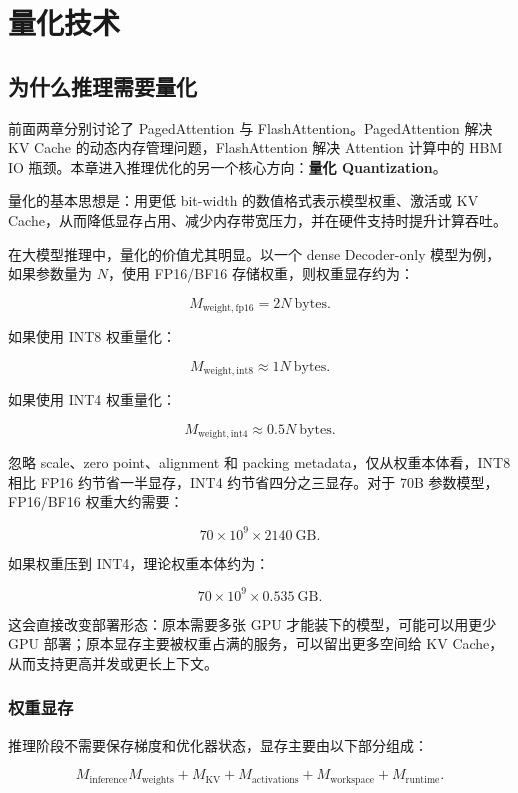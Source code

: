 \chapter{量化技术}
\label{chap:quantization}

\section{为什么推理需要量化}
\label{sec:why-inference-needs-quantization}

前面两章分别讨论了 PagedAttention 与 FlashAttention。PagedAttention 解决 KV Cache 的动态内存管理问题，FlashAttention 解决 Attention 计算中的 HBM IO 瓶颈。本章进入推理优化的另一个核心方向：\textbf{量化 Quantization}。

量化的基本思想是：用更低 bit-width 的数值格式表示模型权重、激活或 KV Cache，从而降低显存占用、减少内存带宽压力，并在硬件支持时提升计算吞吐。

在大模型推理中，量化的价值尤其明显。以一个 dense Decoder-only 模型为例，如果参数量为 $N$，使用 FP16/BF16 存储权重，则权重显存约为：

\[
M_{\mathrm{weight,fp16}} = 2N\ \mathrm{bytes}.
\]

如果使用 INT8 权重量化：

\[
M_{\mathrm{weight,int8}} \approx 1N\ \mathrm{bytes}.
\]

如果使用 INT4 权重量化：

\[
M_{\mathrm{weight,int4}} \approx 0.5N\ \mathrm{bytes}.
\]

忽略 scale、zero point、alignment 和 packing metadata，仅从权重本体看，INT8 相比 FP16 约节省一半显存，INT4 约节省四分之三显存。对于 70B 参数模型，FP16/BF16 权重大约需要：

\[
70\times 10^9\times 2
140\ \mathrm{GB}.
\]

如果权重压到 INT4，理论权重本体约为：

\[
70\times 10^9\times 0.5
35\ \mathrm{GB}.
\]

这会直接改变部署形态：原本需要多张 GPU 才能装下的模型，可能可以用更少 GPU 部署；原本显存主要被权重占满的服务，可以留出更多空间给 KV Cache，从而支持更高并发或更长上下文。

\subsection{权重显存}
\label{subsec:weight-memory}

推理阶段不需要保存梯度和优化器状态，显存主要由以下部分组成：

\[
M_{\mathrm{inference}}
M_{\mathrm{weights}}
+
M_{\mathrm{KV}}
+
M_{\mathrm{activations}}
+
M_{\mathrm{workspace}}
+
M_{\mathrm{runtime}}.
\]

